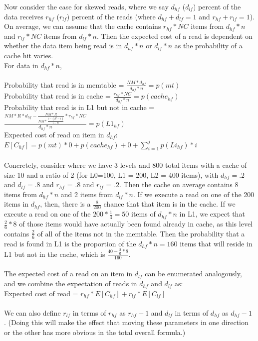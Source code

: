 \documentclass[11pt]{article}
\theoremstyle{plain}
\theoremstyle{definition}
\begin{document}
Now consider the case for skewed reads, where we say $d_{hf}$ ($d_{lf}$) percent of the data receives $r_{hf}$ ($r_{lf}$) percent of the reads (where $d_{hf} + d_{lf} = 1$ and $r_{hf} + r_{lf} = 1$). On average, we can assume that the cache contains $r_{hf} * NC$ items from $d_{hf} * n$ and $r_{lf} * NC$ items from $d_{lf} * n$. Then the expected cost of a read is dependent on whether the data item being read is in $d_{hf} * n$ or $d_{lf} * n$ as the probability of a cache hit varies.\\
For data in $d_{hf} * n$, \\ \\
Probability that read is in memtable = $\frac{NM*d_{hf}}{d_{hf} *n}  = p(mt)$\\
Probability that read is in cache = $\frac{r_{hf} * NC}{d_{hf} * n} = p(cache_{hf})$ \\
Probability that read is in L1 but not in cache = $ \frac{NM * R*d_{hf} - \frac{NM * R}{NM * \frac{1-(R^j-1)}{1-R}} * r_{hf} * NC}{d_{hf} * n}  = p(L1_{hf})$ \\
Expected cost of read on item in $d_{hf}$: $E[C_{hf}]= p(mt) * 0  + p(cache_{hf}) + 0 + \sum_{i=1}^j p(Li_{hf}) * i$\\ \\
Concretely, consider where we have 3 levels and 800 total items with a cache of size 10 and a ratio of 2  (for L0=100, L1 = 200, L2 = 400 items), with $d_{hf} = .2$ and $d_{lf} = .8$ and $r_{hf}$ = .8 and $r_{lf}$ = .2. Then the cache on average contains 8 items from $d_{hf} * n$ and 2 items from $d_{lf}*n$. If we execute a read on one of the 200 items in $d_{hf}$, then, there is a $\frac{8}{200}$ chance that that item is in the cache. If we execute a read on one of the $200*\frac{1}{4} = 50$ items of  $d_{hf} * n$ in L1, we expect that $\frac{2}{6} * 8$ of those items would have actually been found already in cache, as this level contains $\frac{2}{6}$ of all of the items not in the memtable. Then the probability that a read is found in L1 is the proportion of the $d_{hf} * n = 160$ items that will reside in L1 but not in the cache, which is $\frac{40 - \frac{2}{6} * 8}{160}$. \\ \\
The expected cost of a read on an item in $d_{lf}$ can be enumerated analogously, and we combine the expectation of reads in $d_{hf}$ and $d_{lf}$ as: \\
Expected cost of read = $r_{hf} * E[C_{hf}] + r_{lf} * E[C_{lf}]$ \\ \\
We can also define $r_{lf}$ in terms of $r_{hf}$ as $r_{hf} - 1$ and  $d_{lf}$ in terms of $d_{hf}$ as $d_{hf} - 1$ . (Doing this will make the effect that moving these parameters in one direction or the other has more obvious in the total overall formula.)
\end{document}
